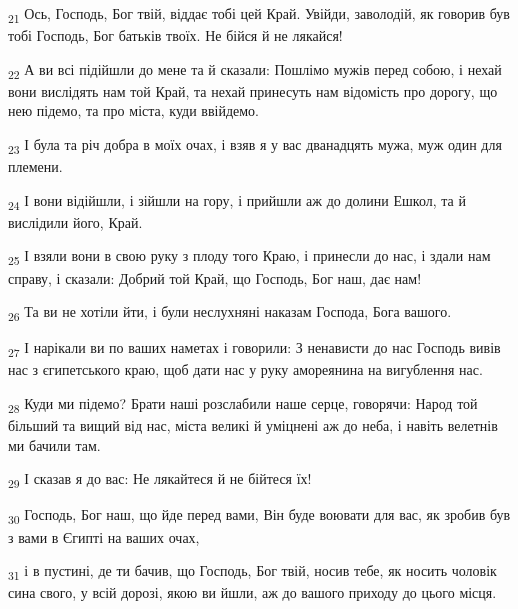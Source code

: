\begin{tcolorbox}
\textsubscript{21} Ось, Господь, Бог твій, віддає тобі цей Край. Увійди, заволодій, як говорив був тобі Господь, Бог батьків твоїх. Не бійся й не лякайся!
\end{tcolorbox}
\begin{tcolorbox}
\textsubscript{22} А ви всі підійшли до мене та й сказали: Пошлімо мужів перед собою, і нехай вони вислідять нам той Край, та нехай принесуть нам відомість про дорогу, що нею підемо, та про міста, куди ввійдемо.
\end{tcolorbox}
\begin{tcolorbox}
\textsubscript{23} І була та річ добра в моїх очах, і взяв я у вас дванадцять мужа, муж один для племени.
\end{tcolorbox}
\begin{tcolorbox}
\textsubscript{24} І вони відійшли, і зійшли на гору, і прийшли аж до долини Ешкол, та й вислідили його, Край.
\end{tcolorbox}
\begin{tcolorbox}
\textsubscript{25} І взяли вони в свою руку з плоду того Краю, і принесли до нас, і здали нам справу, і сказали: Добрий той Край, що Господь, Бог наш, дає нам!
\end{tcolorbox}
\begin{tcolorbox}
\textsubscript{26} Та ви не хотіли йти, і були неслухняні наказам Господа, Бога вашого.
\end{tcolorbox}
\begin{tcolorbox}
\textsubscript{27} І нарікали ви по ваших наметах і говорили: З ненависти до нас Господь вивів нас з єгипетського краю, щоб дати нас у руку амореянина на вигублення нас.
\end{tcolorbox}
\begin{tcolorbox}
\textsubscript{28} Куди ми підемо? Брати наші розслабили наше серце, говорячи: Народ той більший та вищий від нас, міста великі й уміцнені аж до неба, і навіть велетнів ми бачили там.
\end{tcolorbox}
\begin{tcolorbox}
\textsubscript{29} І сказав я до вас: Не лякайтеся й не бійтеся їх!
\end{tcolorbox}
\begin{tcolorbox}
\textsubscript{30} Господь, Бог наш, що йде перед вами, Він буде воювати для вас, як зробив був з вами в Єгипті на ваших очах,
\end{tcolorbox}
\begin{tcolorbox}
\textsubscript{31} і в пустині, де ти бачив, що Господь, Бог твій, носив тебе, як носить чоловік сина свого, у всій дорозі, якою ви йшли, аж до вашого приходу до цього місця.
\end{tcolorbox}
